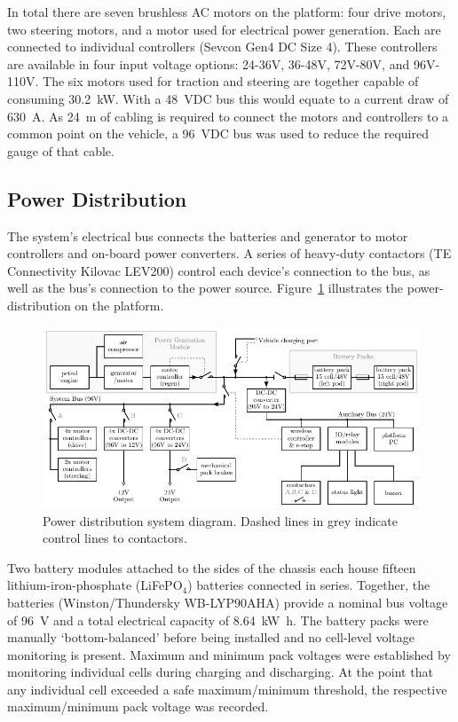 \documentclass[preprint,authoryear,12pt]{elsarticle}
\begin{document}
        In total there are seven brushless AC motors on the platform: four drive motors, two steering motors, and a motor used for electrical power generation.
        Each are connected to individual controllers (Sevcon Gen4 DC Size 4).
        These controllers are available in four input voltage options: 24-36V, 36-48V, 72V-80V, and 96V-110V.
        The six motors used for traction and steering are together capable of consuming \SI{30.2}{\kilo\watt}.
        With a \SI{48}{\volt}DC bus this would equate to a current draw of \SI{630}{\ampere}.
        As \SI{24}{\meter} of cabling is required to connect the motors and controllers to a common point on the vehicle, a \SI{96}{\volt}DC bus was used to reduce the required gauge of that cable.


    \subsection{Power Distribution}
    \label{sub:power}
        The system's electrical bus connects the batteries and generator to motor controllers and on-board power converters.
        A series of heavy-duty contactors (TE Connectivity Kilovac LEV200) control each device's connection to the bus, as well as the bus's connection to the power source.
        Figure~\ref{fig:power_system_diagram} illustrates the power-distribution on the platform.

        \begin{figure}[htb]
            \centering
            \includegraphics[width=\linewidth]{images/full-system-diagram_v1.pdf}
            \caption{Power distribution system diagram. Dashed lines in grey indicate control lines to contactors.}
            \label{fig:power_system_diagram}
        \end{figure}

        Two battery modules attached to the sides of the chassis each house fifteen lithium-iron-phosphate (LiFePO$_{\text{4}}$) batteries connected in series.
        Together, the batteries (Winston/Thundersky WB-LYP90AHA) provide a nominal bus voltage of \SI{96}{\volt} and a total electrical capacity of \SI{8.64}{\kilo\watt\hour}.
        The battery packs were manually `bottom-balanced' before being installed and no cell-level voltage monitoring is present.
        Maximum and minimum pack voltages were established by monitoring individual cells during charging and discharging.
        At the point that any individual cell exceeded a safe maximum/minimum threshold, the respective maximum/minimum pack voltage was recorded.
\end{document}

